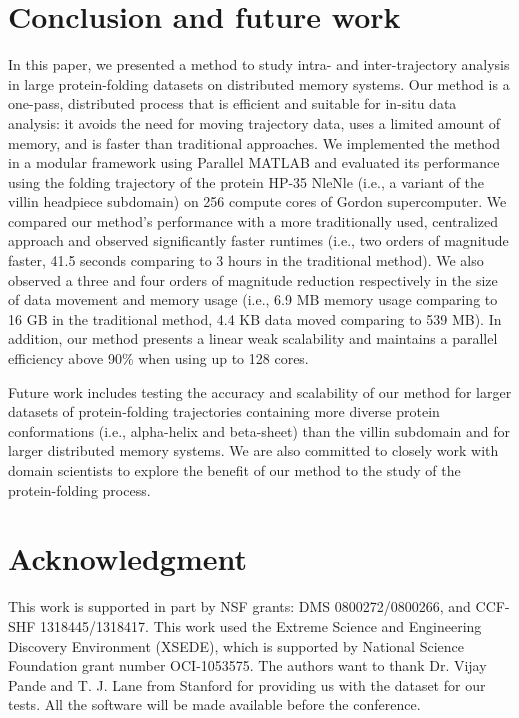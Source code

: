 
\section{Conclusion and future work}
\label{s:conclusions}

In this paper, we presented a method to study intra- and
inter-trajectory analysis in large protein-folding datasets on
distributed memory systems. Our method is a one-pass, distributed
process that is efficient and suitable for in-situ data analysis:
it avoids the need for moving trajectory data, uses a limited amount of 
memory, and is faster than traditional approaches.
We implemented the method in a modular framework using
Parallel MATLAB and evaluated its performance using the folding
trajectory of the protein HP-35 NleNle (i.e., a variant of the villin
headpiece subdomain) on 256 compute cores of Gordon supercomputer. 
We compared our method's performance with a more traditionally used,
centralized approach and observed significantly faster runtimes
(i.e., two orders of magnitude faster, 41.5 seconds comparing to 3
hours in the traditional method). We also observed a three and four
orders of magnitude reduction respectively in the size of data
movement and memory usage (i.e., 6.9 MB memory usage comparing to 16
GB in the traditional method, 4.4 KB data moved comparing to 539
MB). In addition, our method presents a linear weak scalability and
maintains a parallel efficiency above 90\% when using up to 128
cores. 

Future work includes testing the accuracy and scalability of our method for 
larger datasets of protein-folding trajectories containing more diverse
protein conformations (i.e., alpha-helix and beta-sheet) than the
villin subdomain and for larger distributed memory systems. We are also 
committed to closely work with domain scientists to
explore the benefit of our method to the study of the protein-folding
process.

\balance


\section*{Acknowledgment}
This work is supported in part by NSF grants: DMS 0800272/0800266, and CCF-SHF 1318445/1318417. This work used the Extreme Science and Engineering Discovery Environment (XSEDE), which is supported by National Science Foundation grant number OCI-1053575. The authors want to thank Dr. Vijay Pande and T. J. Lane from Stanford  for providing us with the dataset for our tests. All the software will be made available before the conference. 


